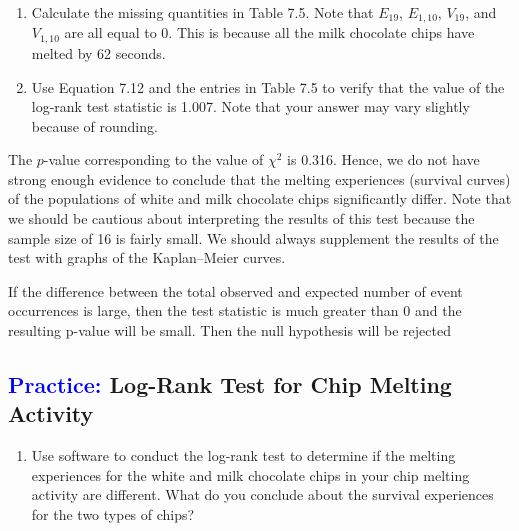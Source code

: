 \documentclass[
]{report}
\providecommand{\tightlist}{%
  \setlength{\itemsep}{0pt}\setlength{\parskip}{0pt}}
\begin{document}
\begin{enumerate}
\def\labelenumi{\arabic{enumi}.}
\setcounter{enumi}{33}
\tightlist
\item
  Calculate the missing quantities in Table 7.5. Note that \(\scriptstyle E_{19}\), \(\scriptstyle E_{1,10}\), \(\scriptstyle V_{19}\), and \(\scriptstyle V_{1,10}\) are all equal to 0. This is because all the milk chocolate chips have melted by 62 seconds.\\
\item
  Use Equation 7.12 and the entries in Table 7.5 to verify that the value of the log-rank test statistic is 1.007. Note that your answer may vary slightly because of rounding.
\end{enumerate}

The \(\scriptstyle p\)-value corresponding to the value of \(\scriptstyle \chi^2\) is 0.316. Hence, we do not have strong enough evidence to conclude that the melting experiences (survival curves) of the populations of white and milk chocolate chips significantly differ. Note that we should be cautious about interpreting the results of this test because the sample size of 16 is fairly small. We should always supplement the results of the test with graphs of the Kaplan--Meier curves.

If the difference between the total observed and expected number of event occurrences is large, then the test statistic is much greater than 0 and the resulting p-value will be small. Then the null hypothesis will be rejected

\hypertarget{log-rank-test-for-chip-melting-activity}{%
\subsection*{\texorpdfstring{\textcolor{blue}{Practice:} Log-Rank Test for Chip Melting Activity}{ Log-Rank Test for Chip Melting Activity}}\label{log-rank-test-for-chip-melting-activity}}

\begin{enumerate}
\def\labelenumi{\arabic{enumi}.}
\setcounter{enumi}{35}
\tightlist
\item
  Use software to conduct the log-rank test to determine if the melting experiences for the white and milk chocolate chips in your chip melting activity are different. What do you conclude about the survival experiences for the two types of chips?
\end{enumerate}
\end{document}
